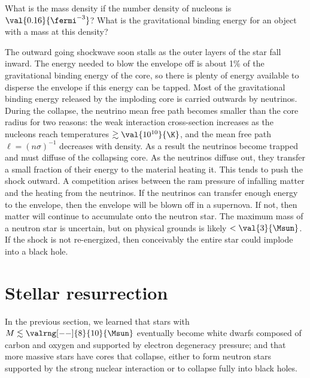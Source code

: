 \begin{exercisebox}
What is the mass density if the number density of nucleons is $\val{0.16}{\fermi^{-3}}$? What is the gravitational binding energy for an object with a mass  at this density?
\end{exercisebox}

The outward going shockwave soon stalls as the outer layers of the star fall inward. The energy needed to blow the envelope off is about 1\% of the gravitational binding energy of the core, so there is plenty of energy available to disperse the envelope if this energy can be tapped. Most of the gravitational binding energy released by the imploding core is carried outwards by neutrinos. 
During the collapse, the neutrino mean free path becomes smaller than the core radius for two reasons: the weak interaction cross-section increases as the nucleons reach temperatures $\gtrsim\val{10^{10}}{\K}$, and the mean free path $\ell = (n\sigma)^{-1}$ decreases with density. 
As a result the neutrinos become trapped and must diffuse of the collapsing core. As the neutrinos diffuse out, they transfer a small fraction of their energy to the material heating it. This tends to push the shock outward. A competition arises between the ram pressure of infalling matter and the heating from the neutrinos. If the neutrinos can transfer enough energy to the envelope, then the envelope will be blown off in a supernova. If not, then matter will continue to accumulate onto the neutron star. The maximum mass of a neutron star is uncertain, but on physical grounds is likely $< \val{3}{\Msun}$. If the shock is not re-energized, then conceivably the entire star could implode into a black hole.

\section{Stellar resurrection}
\label{s.stellar-resurrection}

In the previous section, we learned that stars with $M\lesssim\valrng[--]{8}{10}{\Msun}$ eventually become white dwarfs composed of carbon and oxygen and supported by electron degeneracy pressure; and that more massive stars have cores that collapse, either to form neutron stars supported by the strong nuclear interaction or to collapse fully into black holes.

